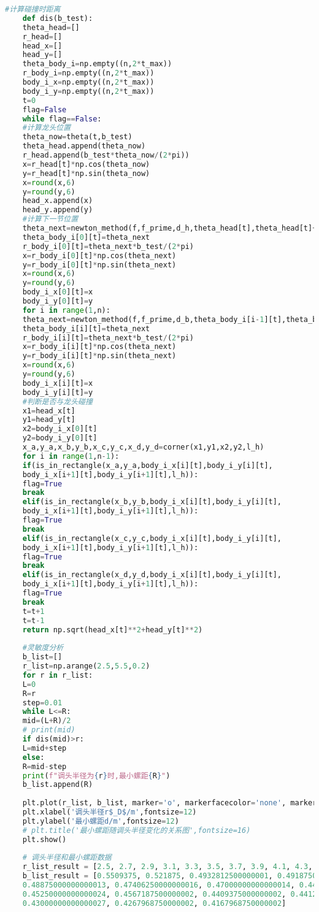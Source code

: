 \documentclass[withoutpreface,bwprint]{cumcmthesis} %
\begin{document}
\begin{lstlisting}[language=Python]
	#计算碰撞时距离
	def dis(b_test):
	theta_head=[]
	r_head=[]
	head_x=[]
	head_y=[]
	theta_body_i=np.empty((n,2*t_max))
	r_body_i=np.empty((n,2*t_max))
	body_i_x=np.empty((n,2*t_max))
	body_i_y=np.empty((n,2*t_max))
	t=0
	flag=False
	while flag==False:
	#计算龙头位置
	theta_now=theta(t,b_test)
	theta_head.append(theta_now)
	r_head.append(b_test*theta_now/(2*pi))
	x=r_head[t]*np.cos(theta_now)
	y=r_head[t]*np.sin(theta_now)
	x=round(x,6)
	y=round(y,6)
	head_x.append(x)
	head_y.append(y)
	#计算下一节位置
	theta_next=newton_method(f,f_prime,d_h,theta_head[t],theta_head[t]+pi/2,b_test)
	theta_body_i[0][t]=theta_next
	r_body_i[0][t]=theta_next*b_test/(2*pi)
	x=r_body_i[0][t]*np.cos(theta_next)
	y=r_body_i[0][t]*np.sin(theta_next)
	x=round(x,6)
	y=round(y,6)
	body_i_x[0][t]=x
	body_i_y[0][t]=y
	for i in range(1,n):
	theta_next=newton_method(f,f_prime,d_b,theta_body_i[i-1][t],theta_body_i[i-1][t]+pi/2,b_test)
	theta_body_i[i][t]=theta_next
	r_body_i[i][t]=theta_next*b_test/(2*pi)
	x=r_body_i[i][t]*np.cos(theta_next)
	y=r_body_i[i][t]*np.sin(theta_next)
	x=round(x,6)
	y=round(y,6)
	body_i_x[i][t]=x
	body_i_y[i][t]=y
	#判断是否与龙头碰撞
	x1=head_x[t]
	y1=head_y[t]
	x2=body_i_x[0][t]
	y2=body_i_y[0][t]
	x_a,y_a,x_b,y_b,x_c,y_c,x_d,y_d=corner(x1,y1,x2,y2,l_h)
	for i in range(1,n-1):
	if(is_in_rectangle(x_a,y_a,body_i_x[i][t],body_i_y[i][t],
	body_i_x[i+1][t],body_i_y[i+1][t],l_h)):
	flag=True
	break
	elif(is_in_rectangle(x_b,y_b,body_i_x[i][t],body_i_y[i][t],
	body_i_x[i+1][t],body_i_y[i+1][t],l_h)):
	flag=True
	break
	elif(is_in_rectangle(x_c,y_c,body_i_x[i][t],body_i_y[i][t],
	body_i_x[i+1][t],body_i_y[i+1][t],l_h)):
	flag=True
	break
	elif(is_in_rectangle(x_d,y_d,body_i_x[i][t],body_i_y[i][t],
	body_i_x[i+1][t],body_i_y[i+1][t],l_h)):
	flag=True
	break
	t=t+1
	t=t-1
	return np.sqrt(head_x[t]**2+head_y[t]**2)
	
	#灵敏度分析
	b_list=[]
	r_list=np.arange(2.5,5.5,0.2)
	for r in r_list:
	L=0
	R=r
	step=0.01
	while L<=R:
	mid=(L+R)/2
	# print(mid)
	if dis(mid)>r:
	L=mid+step
	else:
	R=mid-step
	print(f"调头半径为{r}时,最小螺距{R}")
	b_list.append(R)
	
	plt.plot(r_list, b_list, marker='o', markerfacecolor='none', markeredgecolor=(0, 0.57, 0.79), color=(0, 0.57, 0.79))
	plt.xlabel('调头半径r$_D$/m',fontsize=12)
	plt.ylabel('最小螺距d/m',fontsize=12)
	# plt.title('最小螺距随调头半径变化的关系图',fontsize=16)
	plt.show()
	
	# 调头半径和最小螺距数据
	r_list_result = [2.5, 2.7, 2.9, 3.1, 3.3, 3.5, 3.7, 3.9, 4.1, 4.3, 4.5, 4.7, 4.9, 5.1, 5.3, 5.5]
	b_list_result = [0.5509375, 0.521875, 0.4932812500000001, 0.49187500000000006, 0.49875000000000014, 
	0.48875000000000013, 0.47406250000000016, 0.47000000000000014, 0.44671875000000016, 
	0.45250000000000024, 0.4567187500000002, 0.4409375000000002, 0.44125000000000025, 
	0.43000000000000027, 0.4267968750000002, 0.4167968750000002]
	

\end{lstlisting}
\end{document}
